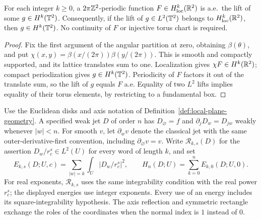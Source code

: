 \begin{lemma}
\label{lem:periodic-sobolev-reconstruction}
\leanok
For each integer $k\ge0$, a $2\pi\mathbb{Z}^2$-periodic function
$F\in H^k_{\mathrm{loc}}(\mathbb{R}^2)$ is a.e.\ the lift of some
$g\in H^k(\mathbb{T}^2)$. Consequently, if the lift of $g\in L^2(\mathbb{T}^2)$
belongs to $H^k_{\mathrm{loc}}(\mathbb{R}^2)$, then $g\in H^k(\mathbb{T}^2)$.
No continuity of $F$ or injective torus chart is required.
\end{lemma}

\begin{proof}
\leanok
Fix the first argument of the angular partition at zero, obtaining
$\beta(\theta)$, and put
$\chi(x,y)=\beta(x/(2\pi))\beta(y/(2\pi))$.
This is smooth and compactly supported, and its lattice translates
sum to one. Localization gives $\chi F\in H^k(\mathbb{R}^2)$; compact
periodization gives $g\in H^k(\mathbb{T}^2)$. Periodicity of $F$ factors it
out of the translate sum, so the lift of $g$ equals $F$ a.e.
Equality of two $L^2$ lifts implies equality of their torus elements,
by restricting to a fundamental box.
\end{proof}

\begin{definition}
\label{def:local-weak-jets}
\leanok
Use the Euclidean disks and axis notation of
Definition~\ref{def:local-plane-geometry}.
A specified weak jet $D$ of order $n$ has $D_\varnothing=f$ and
$\partial_jD_w=D_{jw}$ weakly whenever $|w|<n$.
For smooth $v$, let $\partial_wv$ denote the classical jet with the same
outer-derivative-first convention, including $\partial_\varnothing v=v$.
Write $\mathcal R_{k,s}(D)$ for the assertion
$D_w/r_c^s\in L^2(U)$ for every word of length $k$, and set
\[
 E_{k,s}(D;U,c)=\sum_{|w|=k}\int_U|D_w/r_c^s|^2,\qquad
 H_n(D;U)=\sum_{k=0}^n E_{k,0}(D;U,0).
\]
For real exponents, $\mathcal R_{k,s}$ uses the same integrability
condition with the real power $r_c^s$; the displayed energies use integer
exponents. Every use of an energy includes its square-integrability hypothesis.
The axis reflection and symmetric rectangle exchange the roles of the
coordinates when the normal index is $1$ instead of $0$.
\end{definition}

